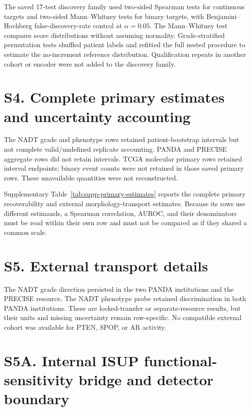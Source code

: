 The saved 17-test discovery family used two-sided Spearman tests for continuous targets and
two-sided Mann--Whitney tests for binary targets, with Benjamini--Hochberg
false-discovery-rate control at $\alpha=0.05$. The Mann--Whitney test compares score
distributions without assuming normality. Grade-stratified permutation tests shuffled
patient labels and refitted the full nested procedure to estimate the no-increment reference
distribution. Qualification repeats in another cohort or encoder were not added to the
discovery family.

\section*{S4. Complete primary estimates and uncertainty accounting}

The NADT grade and phenotype rows retained patient-bootstrap intervals but not complete
valid/undefined replicate accounting. PANDA and PRECISE aggregate rows did not retain
intervals. TCGA molecular primary rows retained interval endpoints; binary event counts
were not retained in those saved primary rows. These unavailable quantities were not
reconstructed.

Supplementary Table~\ref{tab:supp-primary-estimates} reports the complete primary recoverability and
external morphology-transport estimates. Because its rows use different estimands, a
Spearman correlation, AUROC, and their denominators must be read within their own row and
must not be compared as if they shared a common scale.




\section*{S5. External transport details}

The NADT grade direction persisted in the two PANDA institutions and the PRECISE resource.
The NADT phenotype probe retained discrimination in both PANDA institutions. These are
locked-transfer or separate-resource results, but their units and missing uncertainty remain
row-specific. No compatible external cohort was available for PTEN, SPOP, or AR activity.

\section*{S5A. Internal ISUP functional-sensitivity bridge and detector boundary}

